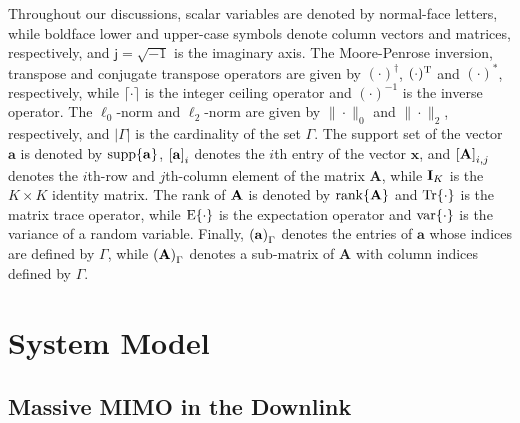 \documentclass[final]{IEEEtran}
\begin{document}
 Throughout our discussions, scalar variables are denoted by normal-face letters, while
 boldface lower and upper-case symbols denote column vectors and matrices, respectively,
 and $\textsf{j}=\sqrt{-1}$ is the imaginary axis. The Moore-Penrose inversion, transpose
 and conjugate transpose operators are given by $(\cdot )^{\dag}$, $(\cdot )^{\rm T}$ and
 $(\cdot )^{*}$, respectively, while $\lceil \cdot \rceil$ is the integer ceiling operator
 and $(\cdot )^{-1}$ is the inverse operator. The $\ell_{0}$-norm and $\ell_{2}$-norm are
 given by $\|\cdot\|_0$ and $\|\cdot\|_2$, respectively, and $\left| \Gamma \right|$ is the
 cardinality of the set $\Gamma$. The support set of the vector $\mathbf{a}$ is denoted by
 ${\rm supp}\{\mathbf{a}\}$, $\left[ {\bf a} \right]_i$ denotes the $i$th entry of the
 vector $\mathbf{x}$, and $\left[ {\bf A} \right]_{i,j}$ denotes the $i$th-row and
 $j$th-column element of the matrix $\mathbf{A}$, while ${\bf I}_K$ is the $K\times K$
 identity matrix. The rank of ${\bf A}$ is denoted by ${\rm rank}\{{\bf A}\}$ and
 ${\rm Tr}\{\cdot \}$ is the matrix trace operator, while ${\rm E}\{\cdot \}$ is the
 expectation operator and ${\rm var}\{\cdot \}$ is the variance of a random variable.
 Finally, $\left( {\bf a} \right)_{\Gamma}$ denotes the entries of $\mathbf{a}$ whose
 indices are defined by $\Gamma$, while $\left( {\bf A}\right)_{\Gamma}$ denotes a
 sub-matrix of $\mathbf{A}$ with column indices defined by $\Gamma$.

\section{System Model}\label{S2}

\subsection{Massive MIMO in the Downlink}\label{S2.1}
\end{document}
